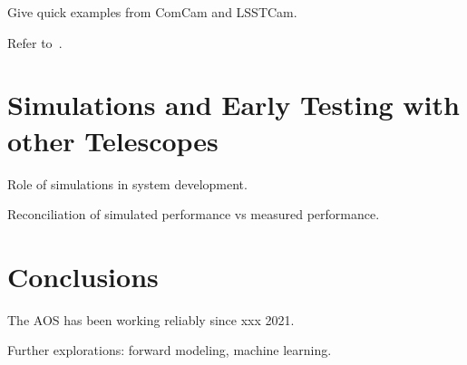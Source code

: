 Give quick examples from ComCam and LSSTCam.

Refer to~\cite{PSTN-032}.

\section{Simulations and Early Testing with other Telescopes}

Role of simulations in system development.

Reconciliation of simulated performance vs measured performance.

\section{Conclusions}

The AOS has been working reliably since xxx 2021.

Further explorations: forward modeling, machine learning.


